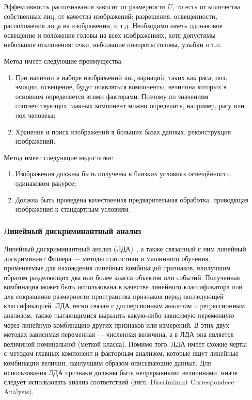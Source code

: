 Эффективность распознавания зависит от размерности $U$, то есть от количества
собственных лиц, от качества изображений: разрешения, освещенности, расположения
лица на изображении, и т.д. Необходимо иметь одинаковое освещение и положение
головы на всех изображениях, хотя допустимы небольшие отклонения: очки, небольшие
повороты головы, улыбки и т.п.

Метод имеет следующие преимущества:
\begin{enumerate}
\item При наличии в наборе изображений лиц вариаций, таких как раса, пол,
эмоции, освещение, будут появляться компоненты, величина которых в основном
определяется этими факторами. Поэтому по значениям соответствующих главных
компонент можно определить, например, расу или пол человека;
\item Хранение и поиск изображений в больших базах данных, реконструкция
изображений.
\end{enumerate}

Метод имеет следующие недостатки:
\begin{enumerate}
\item Изображения должны быть получены в близких условиях освещённости,
одинаковом ракурсе;
\item Должна быть проведена качественная предварительная
обработка, приводящая изображения к стандартным условиям.
\end{enumerate}


\subsubsection{Линейный дискриминантный анализ}

Линейный дискриминантный анализ (ЛДА)~\cite{LDA}, а также связанный с ним
линейный дискриминант Фишера — методы статистики и машинного обучения,
применяемые для нахождения линейных комбинаций признаков, наилучшим образом
разделяющих два или более класса объектов или событий. Полученная комбинация
может быть использована в качестве линейного классификатора или для сокращения
размерности пространства признаков перед последующей классификацией. ЛДА тесно
связан с дисперсионным анализом и регрессионным анализом, также пытающимися
выразить какую-либо зависимую переменную через линейную комбинацию других
признаков или измерений. В этих двух методах зависимая переменная — численная
величина, а в ЛДА она является величиной номинальной (меткой класса). Помимо
того, ЛДА имеет схожие черты с методом главных компонент и факторным анализом,
которые ищут линейные комбинации величин, наилучшим образом описывающие
данные. Для использования ЛДА признаки должны быть непрерывными величинами,
иначе следует использовать анализ соответствий (англ. Discriminant Correspondece
Analysis).


